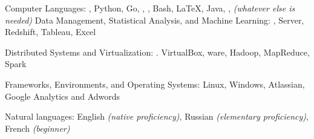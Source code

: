 \documentclass[10pt,letterpaper]{article} %
\begin{document}
\spacedhrule{0.5em}{-0.4em}



\inlineheadsection
    {Computer Languages:}
    {, Python, Go, , , Bash, \LaTeX,
      Java, , \textit{(whatever else is needed)}
    }
    \inlineheadsection
        {Data Management, Statistical Analysis, and Machine Learning:}
        {,  Server, Redshift, Tableau, Excel}

    \inlineheadsection
        {Distributed Systems and Virtualization:}
        {. VirtualBox, ware, Hadoop, MapReduce, Spark}

    \inlineheadsection
        {Frameworks, Environments, and Operating Systems:}
        {Linux, Windows, Atlassian, Google Analytics and Adwords}

    \inlineheadsection
        {Natural languages:}
        {English \textit{(native proficiency)}, Russian
          \textit{(elementary proficiency)}, French \textit{(beginner)}}

\spacedhrule{2.0em}{-0.4em}






\end{document}
